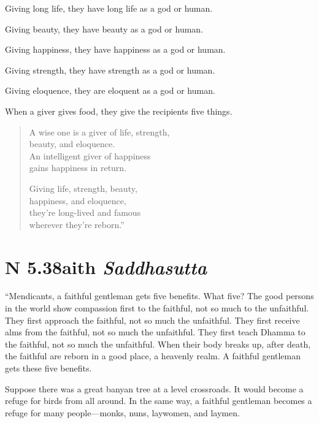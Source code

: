 \documentclass[12pt,openany]{book}%
\newcommand*{\suttatitleacronym}[1]{\smaller[2]{#1}\vspace*{.3em}}
\newcommand*{\suttatitletranslation}[1]{\linebreak{#1}}
\newcommand*{\suttatitleroot}[1]{\linebreak\smaller[2]\itshape{#1}}
\newcommand*{\tocacronym}[1]{\hspace*{-3.3em}{#1}\quad}
\newcommand*{\toctranslation}[1]{#1}
\newcommand*{\tocroot}[1]{(\textit{#1})}
\begin{document}
Giving long life, they have long life as a god or human. 

Giving beauty, they have beauty as a god or human. 

Giving happiness, they have happiness as a god or human. 

Giving strength, they have strength as a god or human. 

Giving eloquence, they are eloquent as a god or human. 

When a giver gives food, they give the recipients five things. 

\begin{verse}%
A wise one is a giver of life, strength, \\
beauty, and eloquence. \\
An intelligent giver of happiness \\
gains happiness in return. 

Giving life, strength, beauty, \\
happiness, and eloquence, \\
they’re long-lived and famous \\
wherever they’re reborn.” 

%
\end{verse}

%
\section*{{\suttatitleacronym AN 5.38}{\suttatitletranslation Faith }{\suttatitleroot Saddhasutta}}
\addcontentsline{toc}{section}{\tocacronym{AN 5.38} \toctranslation{Faith } \tocroot{Saddhasutta}}

“Mendicants, a faithful gentleman gets five benefits. What five? The good persons in the world show compassion first to the faithful, not so much to the unfaithful. They first approach the faithful, not so much the unfaithful. They first receive alms from the faithful, not so much the unfaithful. They first teach Dhamma to the faithful, not so much the unfaithful. When their body breaks up, after death, the faithful are reborn in a good place, a heavenly realm. A faithful gentleman gets these five benefits. 

Suppose there was a great banyan tree at a level crossroads. It would become a refuge for birds from all around. In the same way, a faithful gentleman becomes a refuge for many people—monks, nuns, laywomen, and laymen. 
\end{document}
